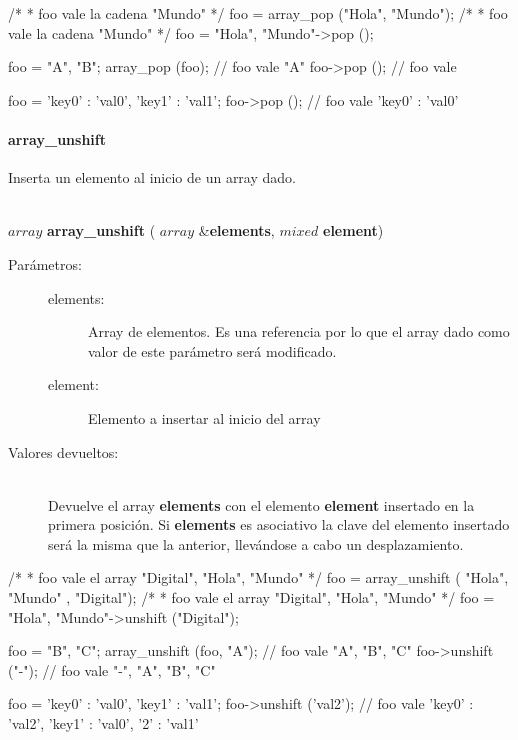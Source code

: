 \begin{myverbatim}   
   /*
    * foo vale la cadena "Mundo"
    */
   foo = array_pop ({"Hola", "Mundo"}); 
   /*
    * foo vale la cadena "Mundo"
    */
   foo = {"Hola", "Mundo"}->pop ();
   
   foo = {"A", "B"};
   array_pop (foo); // foo vale { "A" }
   foo->pop (); // foo vale { }
   
   foo = { 'key0' : 'val0', 'key1' : 'val1'};
   foo->pop (); // foo vale { 'key0' : 'val0' }
\end{myverbatim}


\paragraph{array\_unshift}
Inserta un elemento al inicio de un array dado.

\begin{framed}
\hfill \\ $array$ \textbf{array\_unshift} ( $array$ \&\textbf{elements}, $mixed$ \textbf{element})  
\begin{description}
\item [Parámetros:] \hfill 
   \begin{description}
   \item[elements:] Array de elementos. Es una referencia por lo que el array dado como valor de este parámetro será modificado. 
   \item[element:] Elemento a insertar al inicio del array
   \end{description}
\item[Valores devueltos:] \hfill \\
   Devuelve el array \textbf{elements} con el elemento \textbf{element} insertado en la primera posición. Si \textbf{elements} es
   asociativo la clave del elemento insertado será la misma que la anterior, llevándose a cabo un desplazamiento. 
\end{description}
\end{framed}
     
\begin{myverbatim}   
   /*
    * foo vale el array { "Digital", "Hola", "Mundo" }
    */
   foo = array_unshift ({ "Hola", "Mundo" }, "Digital"); 
   /*
    * foo vale el array { "Digital", "Hola", "Mundo"}
    */
   foo = {"Hola", "Mundo"}->unshift ("Digital");
   
   foo = {"B", "C"};
   array_unshift (foo, "A"); // foo vale { "A", "B", "C" }
   foo->unshift ("-"); // foo vale { "-", "A", "B", "C" }
   
   foo = { 'key0' : 'val0', 'key1' : 'val1'};
   foo->unshift ('val2'); // foo vale { 'key0' : 'val2', 'key1' : 'val0', '2' : 'val1' }
\end{myverbatim}

